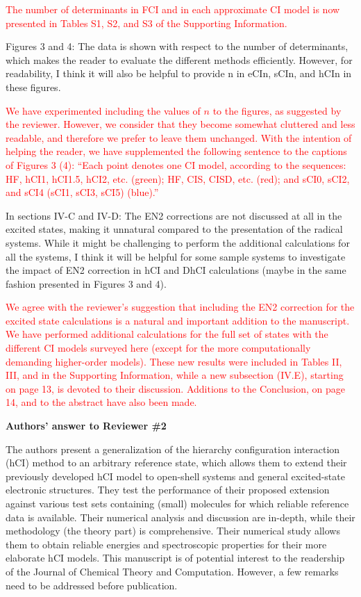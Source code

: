 \documentclass[10pt]{letter}
\newcommand{\alert}[1]{\textcolor{red}{#1}}
\begin{document}
\begin{letter}
\alert{
The number of determinants in FCI and in each approximate CI model is now presented in Tables S1, S2, and S3 of the Supporting Information.
}

{Figures 3 and 4: The data is shown with respect to the number of determinants, which makes the
reader to evaluate the different methods efficiently. However, for readability, I think it will also be
helpful to provide n in eCIn, sCIn, and hCIn in these figures.
}

\alert{
We have experimented including the values of $n$ to the figures, as suggested by the reviewer.
However, we consider that they become somewhat cluttered and less readable, and therefore we prefer to leave them unchanged.
With the intention of helping the reader, we have supplemented the following sentence to the captions of Figures 3 (4):
``Each point denotes one CI model, according to the sequences: HF, hCI1, hCI1.5, hCI2, etc. (green); HF, CIS, CISD, etc. (red); and sCI0, sCI2, and sCI4 (sCI1, sCI3, sCI5) (blue).''
}

{In sections IV-C and IV-D: The EN2 corrections are not discussed at all in the excited states, making
it unnatural compared to the presentation of the radical systems. While it might be challenging to
perform the additional calculations for all the systems, I think it will be helpful for some sample
systems to investigate the impact of EN2 correction in hCI and DhCI calculations (maybe in the
same fashion presented in Figures 3 and 4).
}

\alert{
We agree with the reviewer's suggestion that including the EN2 correction for the excited state calculations is a natural and important addition to the manuscript.
We have performed additional calculations for the full set of states with the different CI models surveyed here (except for the more computationally demanding higher-order models).
These new results were included in Tables II, III, and in the Supporting Information, while a new subsection (IV.E), starting on page 13, is devoted to their discussion.
Additions to the Conclusion, on page 14, and to the abstract have also been made.
}

\clearpage

\noindent \textbf{\large Authors' answer to Reviewer \#2}

{The authors present a generalization of the hierarchy configuration interaction (hCI) method to an arbitrary reference state, which allows them to extend their previously developed hCI model to open-shell systems and general excited-state electronic structures. They test the performance of their proposed extension against various test sets containing (small) molecules for which reliable reference data is available. Their numerical analysis and discussion are in-depth, while their methodology (the theory part) is comprehensive. Their numerical study allows them to obtain reliable energies and spectroscopic properties for their more elaborate hCI models. This manuscript is of potential interest to the readership of the Journal of Chemical Theory and Computation. However, a few remarks need to be addressed before publication.
}


\end{letter}
\end{document}

